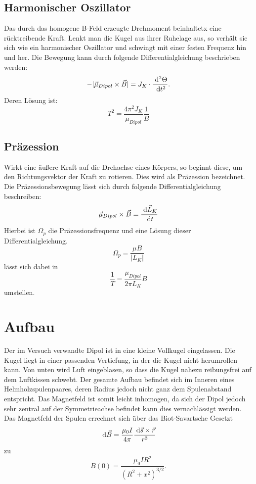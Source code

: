   \subsection{Harmonischer Oszillator}
  Das durch das homogene B-Feld erzeugte Drehmoment beinhaltetx eine rücktreibende Kraft. Lenkt man die Kugel aus ihrer Ruhelage aus, so verhält sie sich wie ein harmonischer Oszillator und schwingt mit einer festen Frequenz hin und her.
Die Bewegung kann durch folgende Differentialgleichung beschrieben werden:
\begin{equation}
-|\vec{\mu}_{Dipol} \times \vec{B}| = J_K \cdot \frac{\; \mathrm{d}^2 \Theta}{\; \mathrm{d} t^2}.
\end{equation}
Deren Lösung ist:
\begin{equation}
T^2=\frac{4\pi^2J_K}{\mu_{Dipol}} \frac{1}{B}
\label{oszi}
\end{equation}
  \subsection{Präzession}
 Wirkt eine äußere Kraft auf die Drehachse eines Körpers, so beginnt diese, um den Richtungsvektor der Kraft zu rotieren. Dies wird als Präzession bezeichnet.
Die Präzessionsbewegung lässt sich durch folgende Differentialgleichung beschreiben:
\begin{equation}
\vec{\mu}_{Dipol} \times \vec{B} = \frac{\; \mathrm{d} \vec{L}_K}{\; \mathrm{d} t}
\end{equation}
Hierbei ist $\Omega_p$ die Präzessionsfrequenz und eine Lösung dieser Differentialgleichung.
\begin{equation}
\Omega_p = \frac{\mu B}{|L_K|}
\end{equation}
lässt sich dabei in
\begin{equation}
\frac{1}{T} = \frac{\mu_{Dipol}}{2 \pi L_K} B
\label{prae}
\end{equation}
umstellen.
\section{Aufbau}
Der im Versuch verwandte Dipol ist in eine kleine Vollkugel eingelassen. Die Kugel liegt in einer passenden Vertiefung, in der die Kugel nicht herumrollen kann. Von unten wird Luft eingeblasen, so dass die Kugel nahezu reibungsfrei auf dem Luftkissen schwebt.
Der gesamte Aufbau befindet sich im Inneren eines Helmholzspulenpaares, deren Radius jedoch nicht ganz dem Spulenabstand entspricht. Das Magnetfeld ist somit leicht inhomogen, da sich der Dipol jedoch sehr zentral auf der Symmetrieachse befindet kann dies vernachlässigt werden.
Das Magnetfeld der Spulen errechnet sich über das Biot-Savartsche Gesetzt
\begin{equation}
\; \mathrm{d} \vec{B} = \frac{\mu_0 I}{4\pi} \frac{\; \mathrm{d} \vec{s} \times \vec{r}}{r^3}
\end{equation} 
zu
\begin{equation}
B(0)=\frac{\mu_0 IR^2}{(R^2+x^2)^{3/2}}.
\label{eqhelm}
\end{equation}

